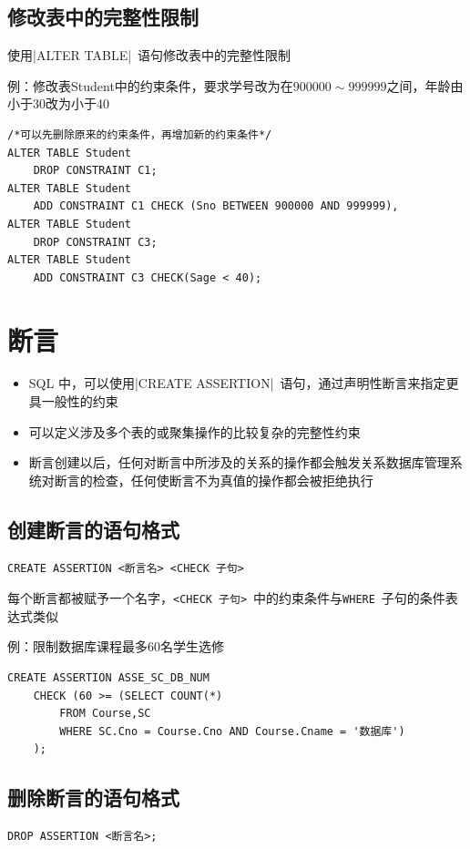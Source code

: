 \subsection{修改表中的完整性限制}
使用\sverb|ALTER TABLE|\ 语句修改表中的完整性限制

例：修改表Student中的约束条件，要求学号改为在$900000\sim 999999$之间，年龄由小于30改为小于40
\begin{lstlisting}
/*可以先删除原来的约束条件，再增加新的约束条件*/
ALTER TABLE Student
	DROP CONSTRAINT C1;
ALTER TABLE Student
	ADD CONSTRAINT C1 CHECK (Sno BETWEEN 900000 AND 999999),
ALTER TABLE Student
	DROP CONSTRAINT C3;
ALTER TABLE Student
	ADD CONSTRAINT C3 CHECK(Sage < 40);
\end{lstlisting}

\section{断言}
\begin{itemize}
    \item SQL 中，可以使用\sverb|CREATE ASSERTION|\ 语句，通过声明性断言来指定更具一般性的约束
    \item 可以定义涉及多个表的或聚集操作的比较复杂的完整性约束
    \item 断言创建以后，任何对断言中所涉及的关系的操作都会触发关系数据库管理系统对断言的检查，任何使断言不为真值的操作都会被拒绝执行
\end{itemize}

\subsection{创建断言的语句格式}
\begin{lstlisting}
CREATE ASSERTION <断言名> <CHECK 子句>
\end{lstlisting}

每个断言都被赋予一个名字，\verb|<CHECK 子句>|\ 中的约束条件与\verb|WHERE|\ 子句的条件表达式类似

例：限制数据库课程最多60名学生选修
\begin{lstlisting}
CREATE ASSERTION ASSE_SC_DB_NUM
    CHECK (60 >= (SELECT COUNT(*)
        FROM Course,SC
        WHERE SC.Cno = Course.Cno AND Course.Cname = '数据库')
    );
\end{lstlisting}

\subsection{删除断言的语句格式} 
\begin{lstlisting}
DROP ASSERTION <断言名>;
\end{lstlisting}

